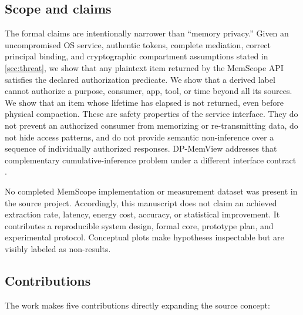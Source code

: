 \subsection{Scope and claims}

The formal claims are intentionally narrower than ``memory privacy.'' Given an uncompromised OS service, authentic tokens, complete mediation, correct principal binding, and cryptographic compartment assumptions stated in \cref{sec:threat}, we show that any plaintext item returned by the MemScope API satisfies the declared authorization predicate. We show that a derived label cannot authorize a purpose, consumer, app, tool, or time beyond all its sources. We show that an item whose lifetime has elapsed is not returned, even before physical compaction. These are safety properties of the service interface. They do not prevent an authorized consumer from memorizing or re-transmitting data, do not hide access patterns, and do not provide semantic non-inference over a sequence of individually authorized responses. DP-MemView addresses that complementary cumulative-inference problem under a different interface contract \citep{kim2026dpmemview,dwork2014algorithmic}.

No completed MemScope implementation or measurement dataset was present in the source project. Accordingly, this manuscript does not claim an achieved extraction rate, latency, energy cost, accuracy, or statistical improvement. It contributes a reproducible system design, formal core, prototype plan, and experimental protocol. Conceptual plots make hypotheses inspectable but are visibly labeled as non-results.

\subsection{Contributions}

The work makes five contributions directly expanding the source concept:

